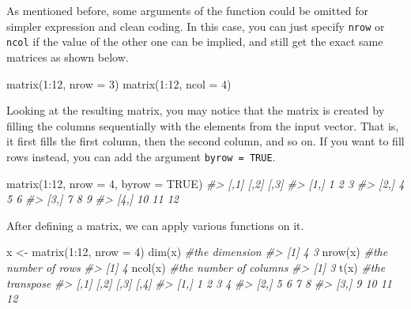 \documentclass[
]{book}
\newenvironment{Shaded}{\begin{snugshade}}{\end{snugshade}}
\newcommand{\AttributeTok}[1]{\textcolor[rgb]{0.77,0.63,0.00}{#1}}
\newcommand{\CommentTok}[1]{\textcolor[rgb]{0.56,0.35,0.01}{\textit{#1}}}
\newcommand{\ConstantTok}[1]{\textcolor[rgb]{0.00,0.00,0.00}{#1}}
\newcommand{\DecValTok}[1]{\textcolor[rgb]{0.00,0.00,0.81}{#1}}
\newcommand{\FunctionTok}[1]{\textcolor[rgb]{0.00,0.00,0.00}{#1}}
\newcommand{\NormalTok}[1]{#1}
\newcommand{\OtherTok}[1]{\textcolor[rgb]{0.56,0.35,0.01}{#1}}
\newcommand{\SpecialCharTok}[1]{\textcolor[rgb]{0.00,0.00,0.00}{#1}}
\begin{document}
As mentioned before, some arguments of the function could be omitted for simpler expression and clean coding. In this case, you can just specify \texttt{nrow} or \texttt{ncol} if the value of the other one can be implied, and still get the exact same matrices as shown below.

\begin{Shaded}
\begin{Highlighting}[]
\FunctionTok{matrix}\NormalTok{(}\DecValTok{1}\SpecialCharTok{:}\DecValTok{12}\NormalTok{, }\AttributeTok{nrow =} \DecValTok{3}\NormalTok{)}
\FunctionTok{matrix}\NormalTok{(}\DecValTok{1}\SpecialCharTok{:}\DecValTok{12}\NormalTok{, }\AttributeTok{ncol =} \DecValTok{4}\NormalTok{)}
\end{Highlighting}
\end{Shaded}

Looking at the resulting matrix, you may notice that the matrix is created by filling the columns sequentially with the elements from the input vector. That is, it first fills the first column, then the second column, and so on. If you want to fill rows instead, you can add the argument \texttt{byrow\ =\ TRUE}.

\begin{Shaded}
\begin{Highlighting}[]
\FunctionTok{matrix}\NormalTok{(}\DecValTok{1}\SpecialCharTok{:}\DecValTok{12}\NormalTok{, }\AttributeTok{nrow =} \DecValTok{4}\NormalTok{, }\AttributeTok{byrow =} \ConstantTok{TRUE}\NormalTok{)}
\CommentTok{\#\textgreater{}      [,1] [,2] [,3]}
\CommentTok{\#\textgreater{} [1,]    1    2    3}
\CommentTok{\#\textgreater{} [2,]    4    5    6}
\CommentTok{\#\textgreater{} [3,]    7    8    9}
\CommentTok{\#\textgreater{} [4,]   10   11   12}
\end{Highlighting}
\end{Shaded}

After defining a matrix, we can apply various functions on it.

\begin{Shaded}
\begin{Highlighting}[]
\NormalTok{x }\OtherTok{\textless{}{-}} \FunctionTok{matrix}\NormalTok{(}\DecValTok{1}\SpecialCharTok{:}\DecValTok{12}\NormalTok{, }\AttributeTok{nrow =} \DecValTok{4}\NormalTok{)}
\FunctionTok{dim}\NormalTok{(x)            }\CommentTok{\#the dimension        }
\CommentTok{\#\textgreater{} [1] 4 3}
\FunctionTok{nrow}\NormalTok{(x)           }\CommentTok{\#the number of rows}
\CommentTok{\#\textgreater{} [1] 4}
\FunctionTok{ncol}\NormalTok{(x)           }\CommentTok{\#the number of columns}
\CommentTok{\#\textgreater{} [1] 3}
\FunctionTok{t}\NormalTok{(x)              }\CommentTok{\#the transpose}
\CommentTok{\#\textgreater{}      [,1] [,2] [,3] [,4]}
\CommentTok{\#\textgreater{} [1,]    1    2    3    4}
\CommentTok{\#\textgreater{} [2,]    5    6    7    8}
\CommentTok{\#\textgreater{} [3,]    9   10   11   12}
\end{Highlighting}
\end{Shaded}
\end{document}
